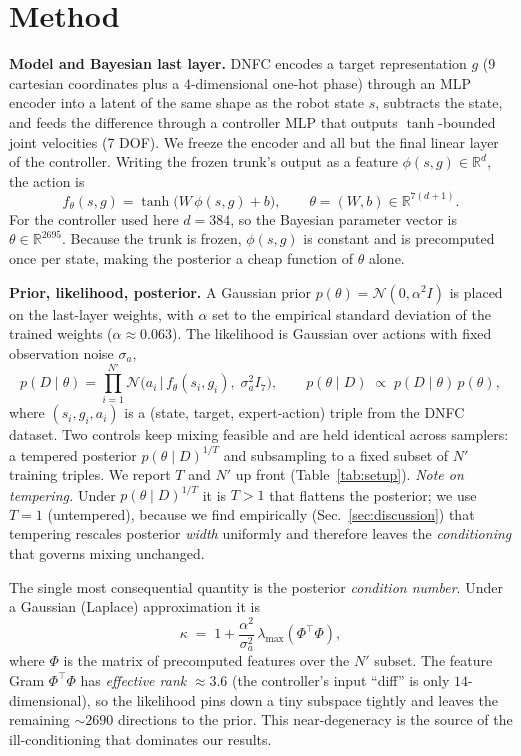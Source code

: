 \documentclass[11pt]{article}
\begin{document}
\section{Method}\label{sec:method}

\textbf{Model and Bayesian last layer.} DNFC encodes a target representation $g$ (9 cartesian coordinates
plus a 4-dimensional one-hot phase) through an MLP encoder into a latent of the same shape as the robot
state $s$, subtracts the state, and feeds the difference through a controller MLP that outputs
$\tanh$-bounded joint velocities (7 DOF). We freeze the encoder and all but the final linear layer of the
controller. Writing the frozen trunk's output as a feature $\phi(s,g)\in\mathbb{R}^{d}$, the action is
\[
f_\theta(s,g) = \tanh\!\big(W\,\phi(s,g) + b\big), \qquad \theta=(W,b)\in\mathbb{R}^{7(d+1)} .
\]
For the controller used here $d=384$, so the Bayesian parameter vector is
$\theta\in\mathbb{R}^{2695}$. Because the trunk is frozen, $\phi(s,g)$ is constant and is precomputed once
per state, making the posterior a cheap function of $\theta$ alone.

\textbf{Prior, likelihood, posterior.} A Gaussian prior $p(\theta)=\mathcal{N}(0,\alpha^2 I)$ is placed on
the last-layer weights, with $\alpha$ set to the empirical standard deviation of the trained weights
($\alpha\approx0.063$). The likelihood is Gaussian over actions with fixed observation noise $\sigma_a$,
\[
p(D\mid\theta)=\prod_{i=1}^{N'}\mathcal{N}\!\big(a_i \,\big|\, f_\theta(s_i,g_i),\;\sigma_a^2 I_7\big),
\qquad
p(\theta\mid D)\;\propto\;p(D\mid\theta)\,p(\theta),
\]
where $(s_i,g_i,a_i)$ is a (state, target, expert-action) triple from the DNFC dataset. Two controls keep
mixing feasible and are held identical across samplers: a tempered posterior $p(\theta\mid D)^{1/T}$ and
subsampling to a fixed subset of $N'$ training triples. We report $T$ and $N'$ up front
(Table~\ref{tab:setup}). \emph{Note on tempering.} Under $p(\theta\mid D)^{1/T}$ it is $T>1$ that flattens
the posterior; we use $T=1$ (untempered), because we find empirically (Sec.~\ref{sec:discussion}) that
tempering rescales posterior \emph{width} uniformly and therefore leaves the \emph{conditioning} that
governs mixing unchanged.

The single most consequential quantity is the posterior \emph{condition number}. Under a Gaussian
(Laplace) approximation it is
\[
\kappa \;=\; 1 + \frac{\alpha^2}{\sigma_a^2}\,\lambda_{\max}(\Phi^\top\Phi),
\]
where $\Phi$ is the matrix of precomputed features over the $N'$ subset. The feature Gram $\Phi^\top\Phi$
has \emph{effective rank} $\approx 3.6$ (the controller's input ``diff'' is only $14$-dimensional), so the
likelihood pins down a tiny subspace tightly and leaves the remaining $\sim\!2690$ directions to the
prior. This near-degeneracy is the source of the ill-conditioning that dominates our results.
\end{document}
